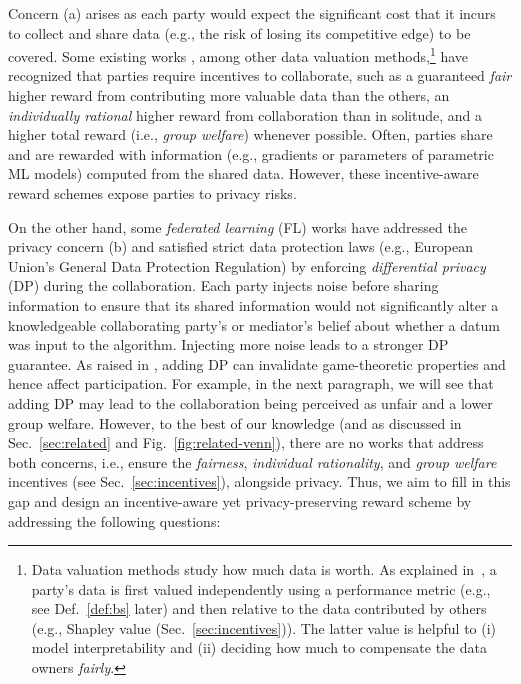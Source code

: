 \documentclass{article}
\theoremstyle{plain}
\theoremstyle{definition}
\theoremstyle{remark}
\renewcommand{\citet}[1]{\cite{#1}}
\begin{document}
Concern (a) arises as each party would expect the significant cost that it incurs to collect and share data (e.g., the risk of losing its competitive edge) to be covered.
Some existing works \cite{simcollaborative,tay2021}, among other data valuation methods,\footnote{Data valuation methods study how much data is worth. As explained in~\citet{sim2022data}, a party's data is first valued independently using a performance metric (e.g., see Def.~\ref{def:bs} later) and then relative to the data contributed by others (e.g., Shapley value (Sec.~\ref{sec:incentives})). The latter value is helpful to (i) model interpretability and (ii) deciding how much to compensate the data owners \emph{fairly}.} have recognized that parties require incentives to collaborate, such as a guaranteed \emph{fair} higher reward from contributing more valuable data than the others, an \emph{individually rational} higher reward from collaboration than in solitude, and a higher total reward (i.e., \emph{group welfare}) whenever possible. Often, parties share and are rewarded with information (e.g., gradients \cite{xu2021gradient} or parameters \cite{simcollaborative} of parametric ML models) computed from the shared data. However, these incentive-aware reward schemes expose parties to privacy risks.

On the other hand, some \emph{federated learning} (FL) works  \cite{mcmahan2017seminalFL} have addressed the privacy concern (b) and satisfied strict data protection laws (e.g., European Union's General Data Protection Regulation) by enforcing \emph{differential privacy} (DP) \cite{abadi2016deep,mcmahan2017learning} during the collaboration. Each party injects noise before sharing information to ensure that its shared information would not significantly alter a knowledgeable collaborating party's or mediator's belief about whether a datum was input to the algorithm. Injecting more noise leads to a stronger DP guarantee.
As raised in \citet{Yu21}, adding DP can invalidate game-theoretic properties and hence affect participation. For example, in the next paragraph, we will see that adding DP may lead to the collaboration being perceived as unfair and a lower group welfare.
However, to the best of our knowledge (and as discussed in Sec.~\ref{sec:related} and Fig.~\ref{fig:related-venn}), there are no works that address both concerns, i.e., ensure the \emph{fairness}, \emph{individual rationality}, and \emph{group welfare} incentives (see Sec.~\ref{sec:incentives}), alongside privacy.
Thus, we aim to fill in this gap and design an incentive-aware yet privacy-preserving reward scheme by addressing the following questions:
\end{document}
